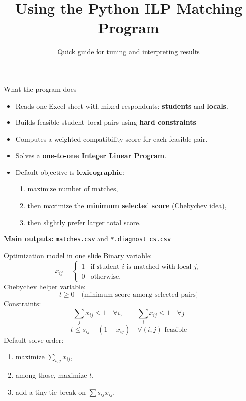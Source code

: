 \documentclass[aspectratio=169]{beamer}
\title{Using the Python ILP Matching Program}
\author{Quick guide for tuning and interpreting results}
\date{}
\begin{document}
\begin{frame}
  \titlepage
\end{frame}

\begin{frame}{What the program does}
\begin{itemize}
  \item Reads one Excel sheet with mixed respondents: \textbf{students} and \textbf{locals}.
  \item Builds feasible student--local pairs using \textbf{hard constraints}.
  \item Computes a weighted compatibility score for each feasible pair.
  \item Solves a \textbf{one-to-one Integer Linear Program}.
  \item Default objective is \textbf{lexicographic}:
  \begin{enumerate}
    \item maximize number of matches,
    \item then maximize the \textbf{minimum selected score} (Chebychev idea),
    \item then slightly prefer larger total score.
  \end{enumerate}
\end{itemize}
\vspace{0.3em}
\textbf{Main outputs:} \texttt{matches.csv} and \texttt{*.diagnostics.csv}
\end{frame}

\begin{frame}{Optimization model in one slide}
Binary variable:
\[
 x_{ij}=\begin{cases}
 1 & \text{if student } i \text{ is matched with local } j,\\
 0 & \text{otherwise.}
 \end{cases}
\]
Chebychev helper variable:
\[
 t \ge 0 \quad \text{(minimum score among selected pairs)}
\]
Constraints:
\[
\sum_j x_{ij} \le 1 \quad \forall i, \qquad \sum_i x_{ij} \le 1 \quad \forall j
\]
\[
 t \le s_{ij} + (1-x_{ij}) \quad \forall (i,j) \text{ feasible}
\]
Default solve order:
\begin{enumerate}
  \item maximize $\sum_{i,j} x_{ij}$,
  \item among those, maximize $t$,
  \item add a tiny tie-break on $\sum s_{ij}x_{ij}$.
\end{enumerate}
\end{frame}
\end{document}
